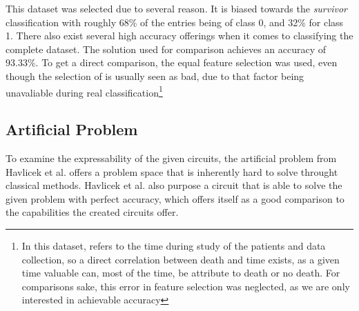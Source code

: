 This dataset \cite{ahmad_survival_2017} was selected due to several reason. It is biased towards the \emph{survivor} classification with roughly 68\% of the entries being of class 0, and 32\% for class 1. There also exist several high accuracy offerings when it comes to classifying the complete dataset. The solution used for comparison\cite{sakhiya_heart_nodate} achieves an accuracy of $93.33\%$. To get a direct comparison, the equal feature selection was used, even though the selection of  is usually seen as bad, due to that factor being unavaliable during real classification\footnote{In this dataset,  refers to the time during study of the patients and data collection, so a direct correlation between death and time exists, as a given time valuable can, most of the time, be attribute to death or no death. For comparisons sake, this error in feature selection was neglected, as we are only interested in achievable accuracy}

\subsection{Artificial Problem}
\label{chapter:artificial_problem}

To examine the expressability of the given circuits, the artificial problem from Havlicek et al. \cite{havlicek_supervised_2019} offers a problem space that is inherently hard to solve throught classical methods. Havlicek et al. also purpose a circuit that is able to solve the given problem with perfect accuracy, which offers itself as a good comparison to the capabilities the created circuits offer.